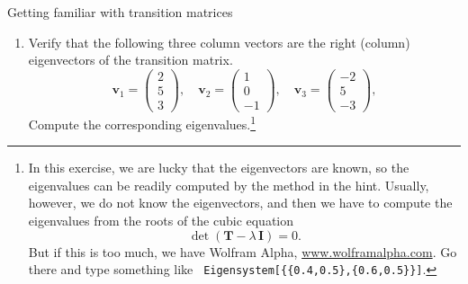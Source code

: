 \documentclass[12pt]{article}
\begin{document}
\begin{problem}{Getting familiar with transition matrices}
\begin{enumerate}
  \begin{figure}[h]
    \centering
  \end{figure}

  \item
  \label{prob1:eigenv}
  Verify that the following three column vectors
  are the right (column) eigenvectors
  of the transition matrix.
  $$
  \mathbf v_1
  =
  \left(
    \begin{array}{r}
      2 \\
      5 \\
      3
    \end{array}
  \right),
  \quad
  \mathbf v_2
  =
  \left(
    \begin{array}{r}
      1 \\
      0 \\
      -1
    \end{array}
  \right),
  \quad
  \mathbf v_3
  =
  \left(
    \begin{array}{r}
      -2 \\
       5 \\
      -3
    \end{array}
  \right),
  $$
  Compute the corresponding eigenvalues.\footnote{
    In this exercise, we are lucky that
    the eigenvectors are known,
    so the eigenvalues can be readily computed
    by the method in the hint.
    Usually, however, we do not know the eigenvectors,
    and then we have to compute the eigenvalues from
    the roots of the cubic equation
    $$
    \det (\mathbf T - \lambda \, \mathbf I) = 0.
    $$
    But if this is too much,
    we have Wolfram Alpha, \url{www.wolframalpha.com}.
    Go there and type something like
    \texttt{
      Eigensystem[\{\{0.4,0.5\},\{0.6,0.5\}\}]}.
  }



\end{enumerate}
\end{problem}
\end{document}
